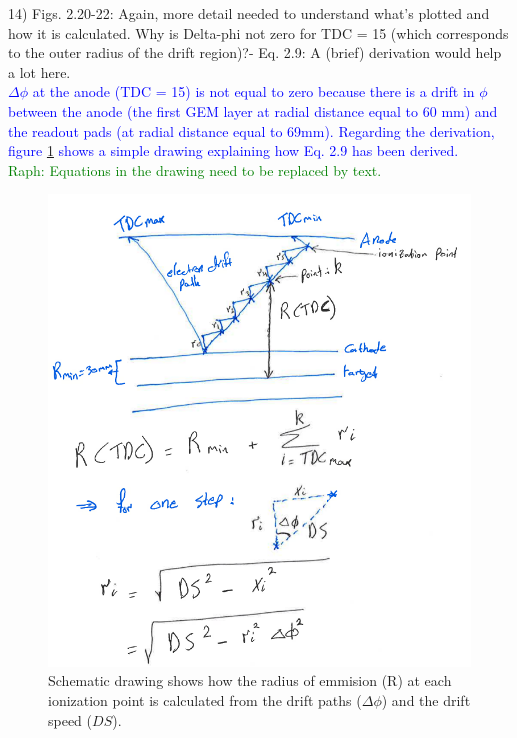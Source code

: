 14) Figs. 2.20-22: Again, more detail needed to understand what's plotted and 
how it is calculated. Why is Delta-phi not zero for TDC = 15 (which corresponds 
to the outer radius of the drift region)?- Eq. 2.9: A (brief) derivation would 
help a lot here.\\
\textcolor{blue}{
$\Delta \phi$ at the anode (TDC = 15) is not equal to zero because there is a 
drift in $\phi$ between the anode (the first GEM layer at radial distance equal to 
60 mm) and the readout pads (at radial distance equal to 69mm). Regarding the 
derivation, figure \ref{fig:drift_derive} shows a simple drawing explaining how 
Eq. 2.9 has been derived.}\\
\textcolor{green}{Raph: Equations in the drawing need to be replaced by text.}

\begin{figure}[!h]
   \centering
   \includegraphics[height=12.5cm]{fig/drift_draw.png}
   \caption{Schematic drawing shows how the radius of emmision (R) at each 
   ionization point is calculated from the drift paths ($\Delta \phi$) and the 
drift speed ($DS$).}
   \label{fig:drift_derive}
\end{figure}

